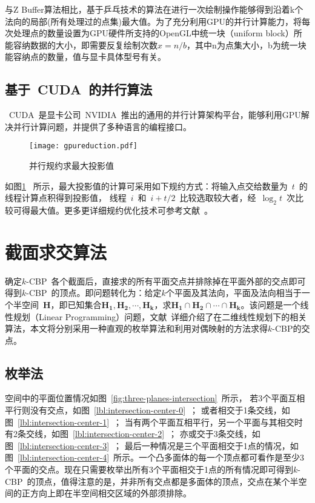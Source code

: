 与Z Buffer算法相比，基于乒乓技术的算法在进行一次绘制操作能够得到沿着k个法向的局部(所有处理过的点集)最大值。为了充分利用GPU的并行计算能力，将每次处理点的数量设置为GPU硬件所支持的OpenGL中统一块（uniform
block）所能容纳数据的大小，即需要反复绘制次数$x=n/b$，其中n为点集大小，b为统一块能容纳点的数量，值与显卡具体型号有关。 

\subsection{基于~CUDA~的并行算法}
\label{subsec:determ-normals-by-cuda}

~CUDA~是显卡公司~NVIDIA~推出的通用的并行计算架构平台，能够利用GPU解决并行计算问题，并提供了多种语言的编程接口。
\begin{figure}[htbp] %
\centering
\texttt{[image: gpureduction.pdf]}
\caption{并行规约求最大投影值}
\label{lbl:reduction-getmax}
\end{figure}
如图\ref{lbl:reduction-getmax}~
所示，最大投影值的计算可采用如下规约方式：将输入点交给数量为~$t$~的线程计算点积得到投影值，
线程~$i$~和~$i +
t/2$~比较选取较大者，经~$\log_2t$~次比较可得最大值。更多更详细规约优化技术可参考文献~。

\section{截面求交算法}
\label{sec:intersect-planes}

确定$k$-CBP~各个截面后，直接求的所有平面交点并排除掉在平面外部的交点即可得到$k$-CBP~的顶点。即问题转化为：给定$k$个平面及其法向，平面及法向相当于一个半空间~$\bm{H}$，即已知集合${\bm{H_1},
\bm{H_2}, \cdots, \bm{H_k}}$，求$\bm{H_1} \cap \bm{H_2} \cap \cdots
\cap \bm{H_k}$。该问题是一个线性规划（Linear
Programming）问题，文献~详细介绍了在二维线性规划下的相关算法，本文将分别采用一种直观的枚举算法和利用对偶映射的方法求得$k$-CBP的交点。

\subsection{枚举法}
\label{subsec:intersection-enum-geometry}

空间中的平面位置情况如图~\ref{fig:three-planes-intersection}~所示，
若3个平面互相平行则没有交点，如图~\ref{lbl:intersection-center-0}~；
或者相交于1条交线，如图~\ref{lbl:intersection-center-1}~；
当有两个平面互相平行，另一个平面与其相交时有2条交线，如图~\ref{lbl:intersection-center-2}~；
亦或交于3条交线，如图~\ref{lbl:intersection-center-3}~；
最后一种情况是三个平面相交于1点的情况，如图~\ref{lbl:intersection-center-4}~所示。一个凸多面体的每一个顶点都可看作是至少3个平面的交点。现在只需要枚举出所有3个平面相交于1点的所有情况即可得到$k$-CBP~的顶点，值得注意的是，并非所有交点都是多面体的顶点，交点在某个半空间的正方向上即在半空间相交区域的外部须排除。


